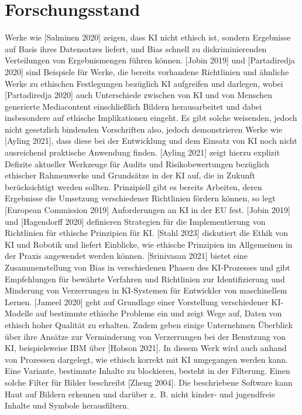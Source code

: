 \documentclass[12pt]{article}
\begin{document}
\section{Forschungsstand}
Werke wie [Salminen 2020] zeigen, dass KI nicht ethisch ist, sondern Ergebnisse auf Basis ihres Datensatzes liefert, und Bias schnell zu diskriminierenden Verteilungen von Ergebnismengen führen können. [Jobin 2019] und [Partadiredja 2020] sind Beispiele für Werke, die bereits vorhandene Richtlinien und ähnliche Werke zu ethischen Festlegungen bezüglich KI aufgreifen und darlegen, wobei [Partadiredja 2020] auch Unterschiede zwischen von KI und von Menschen generierte Mediacontent einschließlich Bildern herausarbeitet und dabei insbesondere auf ethische Implikationen eingeht. Es gibt solche weisenden, jedoch nicht gesetzlich bindenden Vorschriften also, jedoch demonstrieren Werke wie [Ayling 2021], dass diese bei der Entwicklung und dem Einsatz von KI noch nicht ausreichend praktische Anwendung finden. [Ayling 2021] zeigt hierzu explizit Defizite aktueller Werkzeuge für Audits und Risikobewertungen bezüglich ethischer Rahmenwerke und Grundsätze in der KI auf, die in Zukunft berücksichtigt werden sollten. 
Prinzipiell gibt es bereits Arbeiten, deren Ergebnisse die Umsetzung verschiedener Richtlinien fördern können, so legt [European Commission 2019] Anforderungen an KI in der EU fest. [Jobin 2019] und [Hagendorff 2020] definieren Strategien für die Implementierung von Richtlinien für ethische Prinzipien für KI. [Stahl 2023] diskutiert die Ethik von KI und Robotik und liefert Einblicke, wie ethische Prinzipien im Allgemeinen in der Praxis angewendet werden können. [Srinivasan 2021] bietet eine Zusammenstellung von Bias in verschiedenen Phasen des KI-Prozesses und gibt Empfehlungen für bewährte Verfahren und Richtlinien zur Identifizierung und Minderung von Verzerrungen in KI-Systemen für Entwickler von maschinellem Lernen. [Jameel 2020] geht auf Grundlage einer Vorstellung verschiedener KI-Modelle auf bestimmte ethische Probleme ein und zeigt Wege auf, Daten von ethisch hoher Qualität zu erhalten.
Zudem geben einige Unternehmen Überblick über ihre Ansätze zur Verminderung von Verzerrungen bei der Benutzung von KI, beispielsweise IBM über [Hobson 2021]. In diesem Werk wird auch anhand von Prozessen dargelegt, wie ethisch korrekt mit KI umgegangen werden kann.
Eine Variante, bestimmte Inhalte zu blockieren, besteht in der Filterung. Einen solche Filter für Bilder beschreibt [Zheng 2004]. Die beschriebene Software kann Haut auf Bildern erkennen und darüber z. B. nicht kinder- und jugendfreie Inhalte und Symbole herausfiltern.
\end{document}
